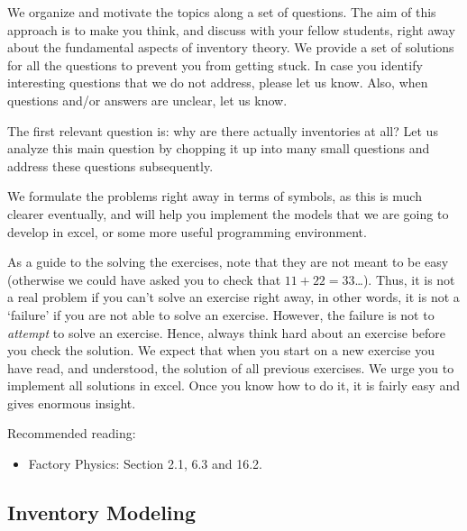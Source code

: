 
We organize and motivate the topics along a set of questions.  The aim
of this approach is to make you think, and discuss with your fellow
students, right away about the fundamental aspects of inventory
theory.  We provide a set of solutions for all the questions to
prevent you from getting stuck.  In case you identify interesting
questions that we do not address, please let us know. Also, when
questions and/or answers are unclear, let us know.

The first relevant question is: why are there actually inventories at
all? Let us analyze this main question by chopping it up into many
small questions and address these questions subsequently. 

We formulate the problems right away in terms of symbols, as this is
much clearer eventually, and will help you implement the models that
we are going to develop in excel, or some more useful programming
environment.


As a guide to the solving the exercises, note that they are not meant
to be easy (otherwise we could have asked you to check that
$11+22=33$\ldots). Thus, it is not a real problem if you can't solve
an exercise right away, in other words, it is not a `failure' if you
are not able to solve an exercise. However, the failure is not to
\emph{attempt} to solve an exercise. Hence, always think hard about an
exercise before you check the solution.  We expect that when you start
on a new exercise you have read, and understood, the solution of all
previous exercises. We urge you to implement all solutions in
excel. Once you know how to do it, it is fairly easy and gives
enormous insight.



Recommended reading:
\begin{itemize}
\item Factory Physics: Section 2.1, 6.3 and  16.2. 
\end{itemize}

\subsection{Inventory Modeling}
\label{sec:inventory-modeling}

